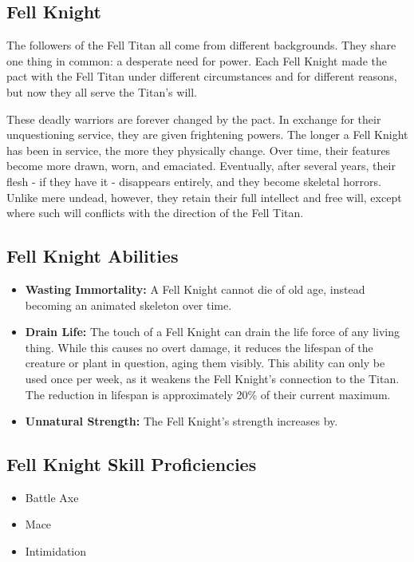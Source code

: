 \begin{multicols}{2}
\section{Fell Knight}

The followers of the Fell Titan all come from different backgrounds.
They share one thing in common: a desperate need for power. Each Fell
Knight made the pact with the Fell Titan under different circumstances
and for different reasons, but now they all serve the Titan's will.

These deadly warriors are forever changed by the pact. In exchange for
their unquestioning service, they are given frightening powers. The longer
a Fell Knight has been in service, the more they physically change. Over
time, their features become more drawn, worn, and emaciated. Eventually,
after several years, their flesh - if they have it - disappears entirely,
and they become skeletal horrors. Unlike mere undead, however, they retain
their full intellect and free will, except where such will conflicts with
the direction of the Fell Titan.

\subsection{Fell Knight Abilities}

\begin{itemize}
  \item \textbf{Wasting Immortality:} A Fell Knight cannot die of old age,
    instead becoming an animated skeleton over time.
  \item \textbf{Drain Life:} The touch of a Fell Knight can drain the life
    force of any living thing. While this causes no overt damage, it reduces
    the lifespan of the creature or plant in question, aging them visibly.
    This ability can only be used once per week, as it weakens the Fell
    Knight's connection to the Titan. The reduction in lifespan is
    approximately 20\% of their current maximum.
  \item \textbf{Unnatural Strength:} The Fell Knight's strength increases by.
\end{itemize}

\subsection{Fell Knight Skill Proficiencies}

\begin{itemize}
  \item Battle Axe
  \item Mace
  \item Intimidation
\end{itemize}


\end{multicols}
